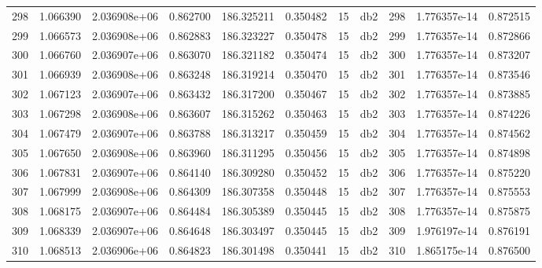 \begin{tabular}{lrrrrrrlrrr}
298  &    1.066390 &        2.036908e+06 &  0.862700 &              186.325211 &    0.350482 &      15 &          db2 &    298 &   1.776357e-14 &      0.872515 \\
299  &    1.066573 &        2.036908e+06 &  0.862883 &              186.323227 &    0.350478 &      15 &          db2 &    299 &   1.776357e-14 &      0.872866 \\
300  &    1.066760 &        2.036907e+06 &  0.863070 &              186.321182 &    0.350474 &      15 &          db2 &    300 &   1.776357e-14 &      0.873207 \\
301  &    1.066939 &        2.036908e+06 &  0.863248 &              186.319214 &    0.350470 &      15 &          db2 &    301 &   1.776357e-14 &      0.873546 \\
302  &    1.067123 &        2.036907e+06 &  0.863432 &              186.317200 &    0.350467 &      15 &          db2 &    302 &   1.776357e-14 &      0.873885 \\
303  &    1.067298 &        2.036908e+06 &  0.863607 &              186.315262 &    0.350463 &      15 &          db2 &    303 &   1.776357e-14 &      0.874226 \\
304  &    1.067479 &        2.036907e+06 &  0.863788 &              186.313217 &    0.350459 &      15 &          db2 &    304 &   1.776357e-14 &      0.874562 \\
305  &    1.067650 &        2.036908e+06 &  0.863960 &              186.311295 &    0.350456 &      15 &          db2 &    305 &   1.776357e-14 &      0.874898 \\
306  &    1.067831 &        2.036907e+06 &  0.864140 &              186.309280 &    0.350452 &      15 &          db2 &    306 &   1.776357e-14 &      0.875220 \\
307  &    1.067999 &        2.036908e+06 &  0.864309 &              186.307358 &    0.350448 &      15 &          db2 &    307 &   1.776357e-14 &      0.875553 \\
308  &    1.068175 &        2.036907e+06 &  0.864484 &              186.305389 &    0.350445 &      15 &          db2 &    308 &   1.776357e-14 &      0.875875 \\
309  &    1.068339 &        2.036907e+06 &  0.864648 &              186.303497 &    0.350445 &      15 &          db2 &    309 &   1.976197e-14 &      0.876191 \\
310  &    1.068513 &        2.036906e+06 &  0.864823 &              186.301498 &    0.350441 &      15 &          db2 &    310 &   1.865175e-14 &      0.876500 \\

\end{tabular}
